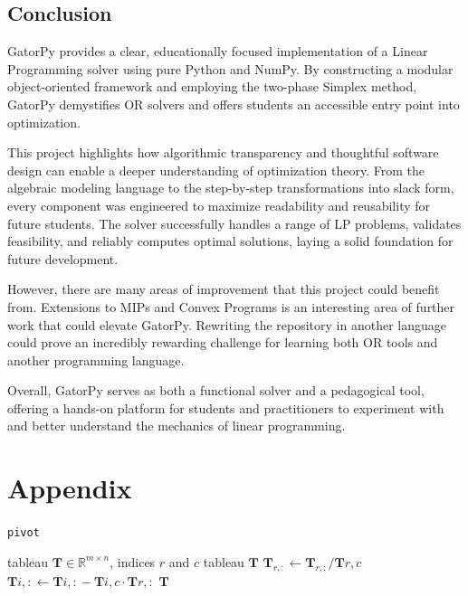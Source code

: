 \documentclass[conference]{IEEEtran}
\begin{document}
\subsection{Conclusion}
GatorPy provides a clear, educationally focused implementation of a Linear Programming solver using pure Python and NumPy. 
By constructing a modular object-oriented framework and employing the two-phase Simplex method, GatorPy demystifies OR solvers and offers students an accessible entry point into optimization.

This project highlights how algorithmic transparency and thoughtful software design can enable a deeper understanding of optimization theory. 
From the algebraic modeling language to the step-by-step transformations into slack form, every component was engineered to maximize readability and reusability for future students. 
The solver successfully handles a range of LP problems, validates feasibility, and reliably computes optimal solutions, laying a solid foundation for future development.

However, there are many areas of improvement that this project could benefit from. 
Extensions to MIPs and Convex Programs is an interesting area of further work that could elevate GatorPy.
Rewriting the repository in another language could prove an incredibly rewarding challenge for learning both OR tools and another programming language.

Overall, GatorPy serves as both a functional solver and a pedagogical tool, offering a hands-on platform for students and practitioners to experiment with and better understand the mechanics of linear programming.

\clearpage
\section{Appendix}
\label{appendix}
\begin{algorithm}
    \caption{\texttt{pivot}}
    \label{alg:pivot}
    \begin{algorithmic}[1]
    \Require tableau $\textbf{T} \in \mathbb{R}^{m \times n}$, indices $r$ and $c$
    \Ensure tableau $\textbf{T}$
    \State $\textbf{T}_{r, :} \gets \textbf{T}_{r, :} / \textbf{T}{r, c}$ 
        \State $\textbf{T}{i, :} \gets \textbf{T}{i, :} - \textbf{T}{i, c} \cdot \textbf{T}{r, :}$ 
    \EndFor
    \State \Return $\textbf{T}$ 
    \end{algorithmic}
    \end{algorithm}
    
\end{document}
